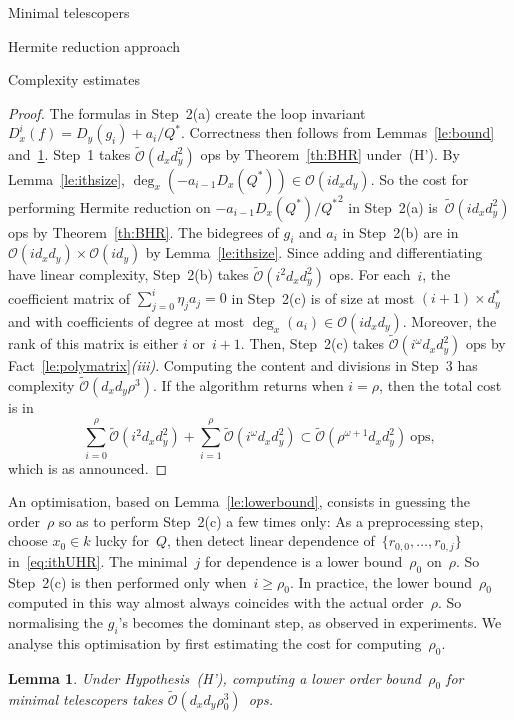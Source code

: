 \documentclass{sig-alt-full}
\newcommand{\bigO}{{\mathcal{O}}}
\newcommand{\bigOsoft}{\tilde{\mathcal{O}}}
\newtheorem{lemma}{Lemma}
\begin{document}
\begin{section}{Minimal telescopers}
\begin{subsection}{Hermite reduction approach}
\begin{subsubsection}{Complexity estimates}
\begin{proof}
The formulas in Step~2(a) create the loop invariant $D_x^i(f) =
D_y(g_i) + a_i/Q^*$.
Correctness then follows from Lemmas~\ref{le:bound} and~\ref{le:costlowerbound}.
Step~1 takes $\bigOsoft(d_xd_y^2)$ ops by Theorem~\ref{th:BHR} under~(H').
By Lemma~\ref{le:ithsize}, $\deg_x(-a_{i-1}D_x(Q^*))\in\bigO(id_xd_y)$.
So the cost for performing Hermite reduction on
$-a_{i-1}D_x(Q^*)/{Q^*}^2$ in Step~2(a) is~$\bigOsoft(id_xd_y^2)$
ops by Theorem~\ref{th:BHR}. The bidegrees of $g_i$ and $a_i$ in
Step~2(b) are in $\bigO(id_xd_y) \times \bigO(id_y)$ by
Lemma~\ref{le:ithsize}. Since adding and differentiating have linear
complexity, Step~2(b) takes $\bigOsoft(i^2d_xd_y^2)$ ops.
For each~$i$, the coefficient matrix of $\sum_{j=0}^i \eta_j a_j =0$
in Step~2(c) is of size at most $(i+1)\times d_y^*$ and with
coefficients of degree at most $\deg_x(a_i)\in \bigO(id_xd_y)$.
Moreover, the rank of this matrix is either $i$ or~$i+1$.
Then, Step~2(c) takes $\bigOsoft(i^{\omega}d_x d_y^2)$ ops by
Fact~\ref{le:polymatrix}\emph{(iii)}.
Computing the content and divisions in Step~3 has
complexity $\bigOsoft(d_xd_y\rho^3)$.
If the algorithm returns when
$i=\rho$, then the total cost is in
\begin{equation}\label{eq:analyis-without-rho0}
\sum_{i=0}^{\rho} \bigOsoft(i^2d_xd_y^2) +
\sum_{i=1}^{\rho} \bigOsoft(i^{\omega} d_x d_y^2)
\subset \bigOsoft(\rho^{\omega+1}d_x d_y^2)~\text{ops},
\end{equation}
which is as announced.
\end{proof}

An optimisation, based on Lemma~\ref{le:lowerbound},
consists in guessing the order~$\rho$ so as to perform
Step~2(c) a few times only:
As a preprocessing step, choose $x_0\in k$ lucky for~$Q$, then detect
linear dependence of~$\{r_{0,0},\dots,r_{0,j}\}$ in~\eqref{eq:ithUHR}.
The minimal~$j$ for dependence is a lower bound~$\rho_0$ on~$\rho$.
So Step~2(c) is then performed only when~$i\ge\rho_0$.
In practice, the lower bound~$\rho_0$ computed in this way almost always
coincides with the actual order~$\rho$.
So normalising the $g_i$'s becomes the dominant step, as observed
in experiments.
We analyse this optimisation by first estimating the cost for
computing~$\rho_0$.

\begin{lemma}\label{le:costlowerbound}
Under Hypothesis~(H'), computing a lower order bound~$\rho_0$ for minimal
telescopers takes $\bigOsoft(d_xd_y\rho_0^3)$~ops.
\end{lemma}


\end{subsubsection}
\end{subsection}
\end{section}
\end{document}
